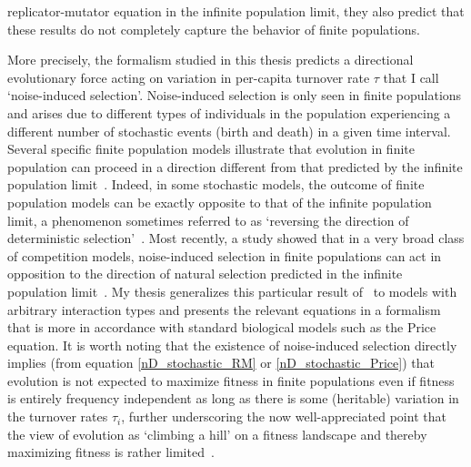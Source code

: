 replicator-mutator equation in the infinite population limit, they also predict that these results do not completely capture the behavior of finite populations.

More precisely, the formalism studied in this thesis predicts a directional evolutionary force acting on variation in per-capita turnover rate $\tau$ that I call `noise-induced selection'. Noise-induced selection is only seen in finite populations and arises due to different types of individuals in the population experiencing a different number of stochastic events (birth and death) in a given time interval. Several specific finite population models illustrate that evolution in finite population can proceed in a direction different from that predicted by the infinite population limit~\citep{parsons_consequences_2010, houchmandzadeh_selection_2012, houchmandzadeh_fluctuation_2015, behar_fluctuations-induced_2016, constable_demographic_2016,abu_awad_effects_2018,parsons_pathogen_2018,mcleod_social_2019}. Indeed, in some stochastic models, the outcome of finite population models can be exactly opposite to that of the infinite population limit, a phenomenon sometimes referred to as `reversing the direction of deterministic selection'~\citep{constable_demographic_2016,mcleod_social_2019}. Most recently, a study showed that in a very broad class of competition models, noise-induced selection in finite populations can act in opposition to the direction of natural selection predicted in the infinite population limit~\citep{mazzolini_universality_2022}. My thesis generalizes this particular result of~\cite{mazzolini_universality_2022} to models with arbitrary interaction types and presents the relevant equations in a formalism that is more in accordance with standard biological models such as the Price equation. It is worth noting that the existence of noise-induced selection directly implies (from equation \eqref{nD_stochastic_RM} or \eqref{nD_stochastic_Price}) that evolution is not expected to maximize fitness in finite populations even if fitness is entirely frequency independent as long as there is some (heritable) variation in the turnover rates $\tau_i$, further underscoring the now well-appreciated point that the view of evolution as `climbing a hill' on a fitness landscape and thereby maximizing fitness is rather limited~\citep{grodwohl_theory_2017}.

